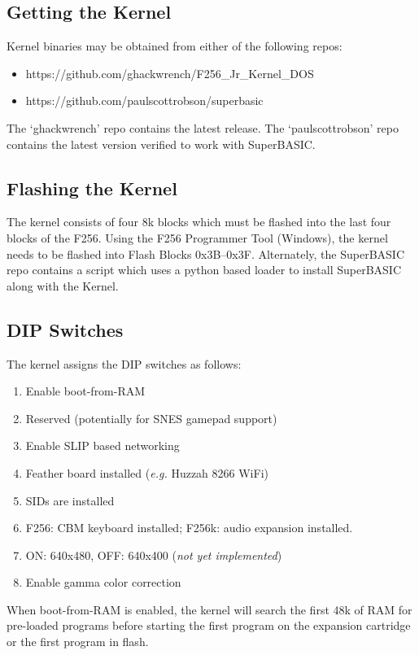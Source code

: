 \subsection*{Getting the Kernel}
Kernel binaries may be obtained from either of the following repos: 

\begin{itemize}
    \item  https://github.com/ghackwrench/F256\_Jr\_Kernel\_DOS
    \item  https://github.com/paulscottrobson/superbasic
\end{itemize}

The `ghackwrench' repo contains the latest release.  The `paulscottrobson' repo contains the latest version verified to work with SuperBASIC.

\subsection*{Flashing the Kernel}
The kernel consists of four 8k blocks which must be flashed into the last four blocks of the F256.  Using the F256 Programmer Tool (Windows), the kernel needs to be flashed into Flash Blocks 0x3B--0x3F.  Alternately, the SuperBASIC repo contains a script which uses a python based loader to install SuperBASIC along with the Kernel.

\subsection*{DIP Switches}
The kernel assigns the DIP switches as follows:

\begin{enumerate}
\item Enable boot-from-RAM
\item Reserved (potentially for SNES gamepad support)
\item Enable SLIP based networking
\item Feather board installed ({\it e.g.} Huzzah 8266 WiFi)
\item SIDs are installed
\item F256: CBM keyboard installed; F256k: audio expansion installed.
\item ON: 640x480, OFF: 640x400 ({\em not yet implemented})
\item Enable gamma color correction
\end{enumerate}

When boot-from-RAM is enabled, the kernel will search the first 48k of RAM for pre-loaded programs before starting the first program on the expansion cartridge or the first program in flash.

